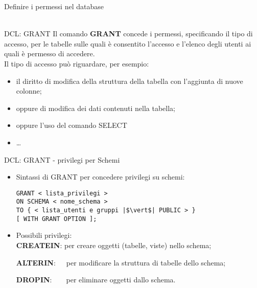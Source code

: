 \begin{frame}[fragile]{Definire i permessi nel database}
\newline
\\
\newline
\\
\end{frame}
%
\begin{frame}[fragile]{DCL: GRANT}
Il comando \textbf{GRANT} concede i permessi, specificando il tipo di accesso, per le tabelle sulle quali \`e consentito l'accesso e l'elenco degli utenti ai quali \`e permesso di accedere.
\newline
\\ Il tipo di accesso pu\`o riguardare, per esempio:
\begin{itemize}[<+->]
    \item il diritto di modifica della struttura della tabella con l'aggiunta di nuove colonne;
    \item oppure di modifica dei dati contenuti nella tabella;
    \item oppure l'uso del comando SELECT
    \item \ldots
\end{itemize}
\end{frame}
%
\begin{frame}[fragile]{DCL: GRANT - privilegi per Schemi}
\begin{itemize}
\item Sintassi di GRANT per concedere privilegi su schemi:
\begin{lstlisting}
GRANT < lista_privilegi >
ON SCHEMA < nome_schema >
TO { < lista_utenti e gruppi |$\vert$| PUBLIC > }
[ WITH GRANT OPTION ];
\end{lstlisting}
\item Possibili privilegi:
\\\textbf{CREATEIN}: per creare oggetti (tabelle, viste) nello schema;

\textbf{ALTERIN}:~~~per modificare la struttura di tabelle dello schema;

\textbf{DROPIN}:~~~~per eliminare oggetti dallo schema.
\end{itemize}
\end{frame}
